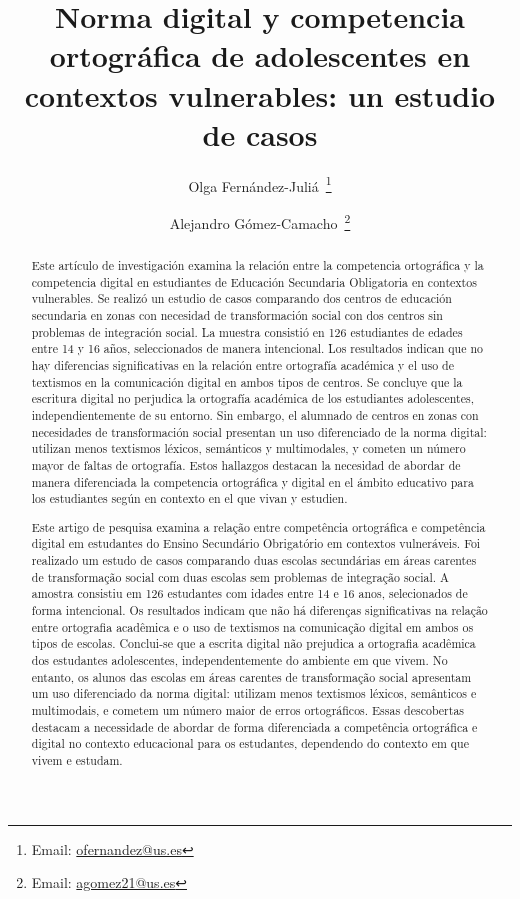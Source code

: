 \documentclass[spanish]{textolivre}
\title{Norma digital y competencia ortográfica de adolescentes en contextos vulnerables: un estudio de casos}
\author[1]{Olga Fernández-Juliá~\orcid{0000-0002-5126-3666}\thanks{Email: \href{mailto:ofernandez@us.es}{ofernandez@us.es}}}
\author[1]{Alejandro Gómez-Camacho~\orcid{0000-0002-6431-6405}\thanks{Email: \href{mailto:agomez21@us.es}{agomez21@us.es}}}
\affil[1]{Universidad de Sevilla, Departamento de Didáctica de la lengua y la literatura y Filologías Integradas, Sevilla, España.}
\begin{document}
\maketitle

\begin{polyabstract}
\begin{abstract}
Este artículo de investigación examina la relación entre la competencia ortográfica y la competencia digital en estudiantes de Educación Secundaria Obligatoria en contextos vulnerables. Se realizó un estudio de casos comparando dos centros de educación secundaria en zonas con necesidad de transformación social con dos centros sin problemas de integración social. La muestra consistió en 126 estudiantes de edades entre 14 y 16 años, seleccionados de manera intencional. Los resultados indican que no hay diferencias significativas en la relación entre ortografía académica y el uso de textismos en la comunicación digital en ambos tipos de centros. Se concluye que la escritura digital no perjudica la ortografía académica de los estudiantes adolescentes, independientemente de su entorno. Sin embargo, el alumnado de centros en zonas con necesidades de transformación social presentan un uso diferenciado de la norma digital: utilizan menos textismos léxicos, semánticos y multimodales, y cometen un número mayor de faltas de ortografía. Estos hallazgos destacan la necesidad de abordar de manera diferenciada la competencia ortográfica y digital en el ámbito educativo para los estudiantes según en contexto en el que vivan y estudien.

\end{abstract}

\begin{portuguese}
\begin{abstract}
Este artigo de pesquisa examina a relação entre competência ortográfica e competência digital em estudantes do Ensino Secundário Obrigatório em contextos vulneráveis. Foi realizado um estudo de casos comparando duas escolas secundárias em áreas carentes de transformação social com duas escolas sem problemas de integração social. A amostra consistiu em 126 estudantes com idades entre 14 e 16 anos, selecionados de forma intencional. Os resultados indicam que não há diferenças significativas na relação entre ortografia acadêmica e o uso de textismos na comunicação digital em ambos os tipos de escolas. Conclui-se que a escrita digital não prejudica a ortografia acadêmica dos estudantes adolescentes, independentemente do ambiente em que vivem. No entanto, os alunos das escolas em áreas carentes de transformação social apresentam um uso diferenciado da norma digital: utilizam menos textismos léxicos, semânticos e multimodais, e cometem um número maior de erros ortográficos. Essas descobertas destacam a necessidade de abordar de forma diferenciada a competência ortográfica e digital no contexto educacional para os estudantes, dependendo do contexto em que vivem e estudam.


\end{abstract}
\end{portuguese}
\end{polyabstract}
\end{document}
